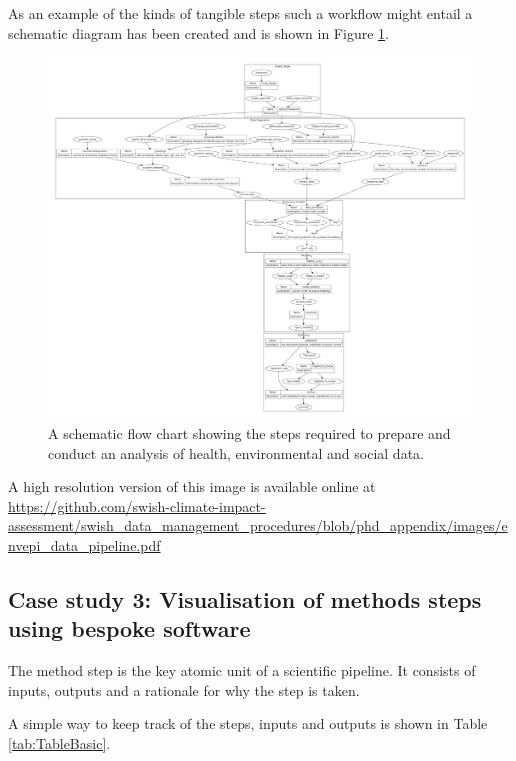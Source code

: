 \documentclass[11pt,a4paper]{article}
\begin{document}
As an example of the kinds of tangible steps such a workflow might
entail a schematic diagram has been created and is shown in Figure
\ref{fig:envepi_data_pipeline.png}.

\begin{figure}[!h]
\centering
\includegraphics[width=\textwidth]{images/envepi_data_pipeline.pdf}
\caption{A schematic flow chart showing the steps required to prepare and
conduct an analysis of health, environmental and social data.}       
\label{fig:envepi_data_pipeline.png}
\end{figure}

A high resolution version of this image is available online at
\href{https://github.com/swish-climate-impact-assessment/swish_data_management_procedures/blob/phd_appendix/images/envepi_data_pipeline.pdf}{\url{https://github.com/swish-climate-impact-assessment/swish_data_management_procedures/blob/phd_appendix/images/envepi_data_pipeline.pdf}}

\subsection{Case study 3: Visualisation of methods steps using bespoke
software}\label{case-study-3-visualisation-of-methods-steps-using-bespoke-software}

The method step is the key atomic unit of a scientific pipeline. It
consists of inputs, outputs and a rationale for why the step is taken.

A simple way to keep track of the steps, inputs and outputs is shown in
Table \ref{tab:TableBasic}.
\end{document}

